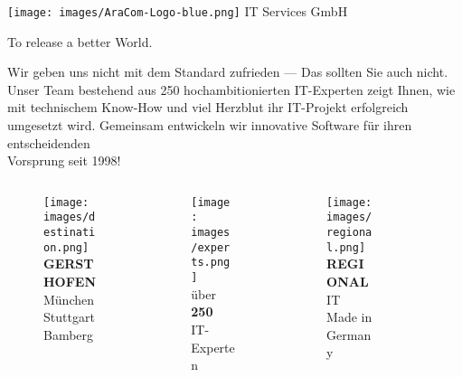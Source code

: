 \documentclass[aspectratio=169]{beamer}
\begin{document}
\begin{frame}{\texttt{[image: images/AraCom-Logo-blue.png]} IT Services GmbH}

  {\LARGE To release a better World.}

  {\normalsize
  Wir geben uns nicht mit dem Standard zufrieden --- Das sollten Sie auch nicht.\\
  Unser Team bestehend aus 250 hochambitionierten IT-Experten zeigt Ihnen, wie mit technischem Know-How und viel Herzblut ihr IT-Projekt erfolgreich umgesetzt wird. Gemeinsam entwickeln wir innovative Software für ihren entscheidenden \\
  Vorsprung seit 1998!
  }
  
  {\footnotesize
  \begin{columns}
    \begin{column}{0.20\textwidth}
      \begin{figure}
        \centering
        \texttt{[image: images/destination.png]}\\
        \textbf{GERSTHOFEN}\\
        München \\
        Stuttgart\\
        Bamberg
      \end{figure}
    \end{column}
    \begin{column}{0.20\textwidth}
      \begin{figure}
        \centering
        \texttt{[image: images/experts.png]}\\
        über \textbf{250}\\ IT-Experten%
        \newline\newline
      \end{figure}
    \end{column}
    \begin{column}{0.20\textwidth}
      \begin{figure}
        \centering
        \texttt{[image: images/regional.png]}\\
        \textbf{REGIONAL}\\ IT Made in Germany\newline
      \end{figure}
    \end{column}
    \begin{column}{0.20\textwidth}
      \begin{figure}

\end{figure}
\end{column}
\end{columns}}
\end{frame}
\end{document}
